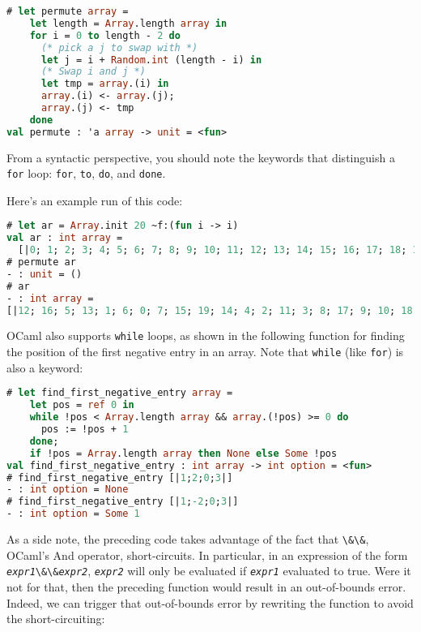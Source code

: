 \begin{lstlisting}[language=Caml]
# let permute array =
    let length = Array.length array in
    for i = 0 to length - 2 do
      (* pick a j to swap with *)
      let j = i + Random.int (length - i) in
      (* Swap i and j *)
      let tmp = array.(i) in
      array.(i) <- array.(j);
      array.(j) <- tmp
    done
val permute : 'a array -> unit = <fun>
\end{lstlisting}

From a syntactic perspective, you should note the keywords that
distinguish a \passthrough{\lstinline!for!} loop:
\passthrough{\lstinline!for!}, \passthrough{\lstinline!to!},
\passthrough{\lstinline!do!}, and \passthrough{\lstinline!done!}.

Here's an example run of this code:

\begin{lstlisting}[language=Caml]
# let ar = Array.init 20 ~f:(fun i -> i)
val ar : int array =
  [|0; 1; 2; 3; 4; 5; 6; 7; 8; 9; 10; 11; 12; 13; 14; 15; 16; 17; 18; 19|]
# permute ar
- : unit = ()
# ar
- : int array =
[|12; 16; 5; 13; 1; 6; 0; 7; 15; 19; 14; 4; 2; 11; 3; 8; 17; 9; 10; 18|]
\end{lstlisting}

OCaml also supports \passthrough{\lstinline!while!} loops, as shown in
the following function for finding the position of the first negative
entry in an array. Note that \passthrough{\lstinline!while!} (like
\passthrough{\lstinline!for!}) is also a keyword:

\begin{lstlisting}[language=Caml]
# let find_first_negative_entry array =
    let pos = ref 0 in
    while !pos < Array.length array && array.(!pos) >= 0 do
      pos := !pos + 1
    done;
    if !pos = Array.length array then None else Some !pos
val find_first_negative_entry : int array -> int option = <fun>
# find_first_negative_entry [|1;2;0;3|]
- : int option = None
# find_first_negative_entry [|1;-2;0;3|]
- : int option = Some 1
\end{lstlisting}

As a side note, the preceding code takes advantage of the fact that
\passthrough{\lstinline!\&\&!}, OCaml's And operator, short-circuits. In
particular, in an expression of the form
\emph{\passthrough{\lstinline!expr1!}}\passthrough{\lstinline!\&\&!}\emph{\passthrough{\lstinline!expr2!}},
\emph{\passthrough{\lstinline!expr2!}} will only be evaluated if
\emph{\passthrough{\lstinline!expr1!}} evaluated to true. Were it not
for that, then the preceding function would result in an out-of-bounds
error. Indeed, we can trigger that out-of-bounds error by rewriting the
function to avoid the short-circuiting:

